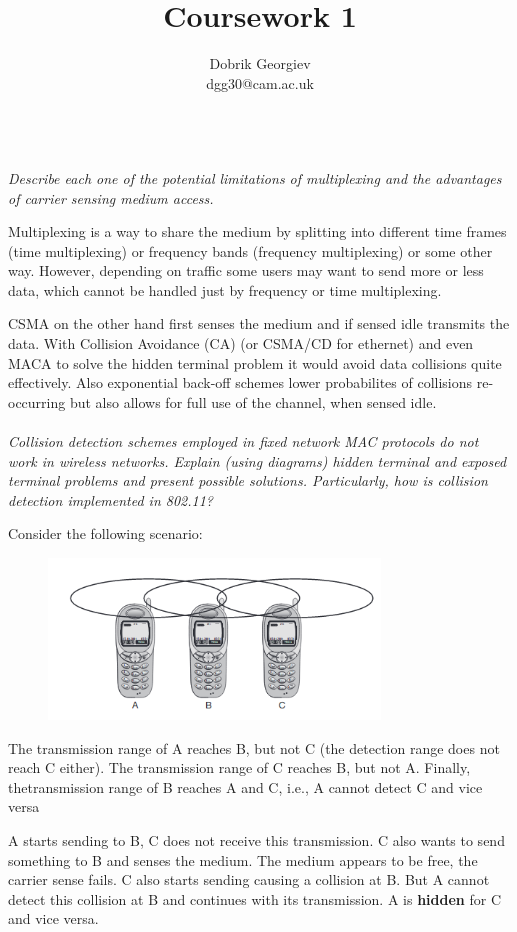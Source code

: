 \documentclass[12pt]{article}
\title{Coursework 1}
\author{Dobrik Georgiev \\ \small dgg30@cam.ac.uk}
\newcommand*\circled[1]{\tikz[baseline=(char.base)]{
		\node[shape=circle,draw,inner sep=0pt] (char) {#1};}}
\begin{document}
\maketitle
~\\
\textit{\circled{1.} Describe each one of the potential limitations of multiplexing
and the advantages of carrier sensing medium access.}

Multiplexing is a way to share the medium by splitting into different time
frames (time multiplexing) or frequency bands (frequency multiplexing) or some
other way. However, depending on traffic some users may want to send more or
less data, which cannot be handled just by frequency or time multiplexing.

CSMA on the other hand first senses the medium and if sensed idle transmits the
data. With Collision Avoidance (CA) (or CSMA/CD for ethernet) and even MACA to
solve the hidden terminal problem it would avoid data collisions quite
effectively. Also exponential back-off schemes lower probabilites of collisions
re-occurring but also allows for full use of the channel, when sensed idle.
\\
\\
\textit{\circled{2.} Collision detection schemes employed in fixed network MAC protocols do not work in wireless
networks. Explain (using diagrams) hidden terminal and exposed terminal problems and present
possible solutions. Particularly, how is collision detection implemented in 802.11?}

Consider the following scenario:
\begin{figure}[H]
    \centering
    \includegraphics[width=250pt]{hidden_terminal.png}
\end{figure}
The transmission range of A reaches B, but not C (the detection range does
not reach C either). The transmission range of C reaches B, but not A. Finally,
thetransmission range of B reaches A and C, i.e., A cannot detect C and vice
versa

A starts sending to B, C does not receive this transmission. C also wants
to send something to B and senses the medium. The medium appears to be free, the
carrier sense fails. C also starts sending causing a collision at B. But
A cannot detect this collision at B and continues with its transmission. A is
\textbf{hidden} for C and vice versa.
\end{document}

